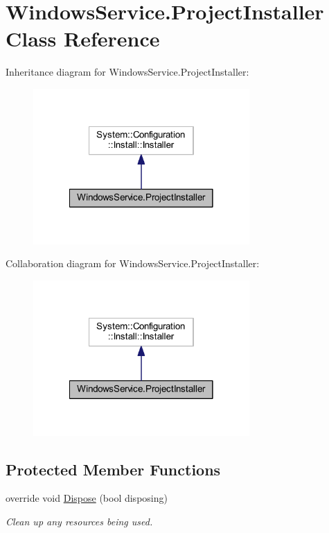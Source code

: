 \hypertarget{class_windows_service_1_1_project_installer}{\section{Windows\-Service.\-Project\-Installer Class Reference}
\label{class_windows_service_1_1_project_installer}
}


Inheritance diagram for Windows\-Service.\-Project\-Installer\-:\nopagebreak
\begin{figure}[H]
\begin{center}
\leavevmode
\includegraphics[width=234pt]{class_windows_service_1_1_project_installer__inherit__graph}
\end{center}
\end{figure}


Collaboration diagram for Windows\-Service.\-Project\-Installer\-:\nopagebreak
\begin{figure}[H]
\begin{center}
\leavevmode
\includegraphics[width=234pt]{class_windows_service_1_1_project_installer__coll__graph}
\end{center}
\end{figure}
\subsection*{Protected Member Functions}
\begin{DoxyCompactItemize}
\item 
override void \hyperlink{class_windows_service_1_1_project_installer_aa57f35eb3d69fcb269363c2bf9445169}{Dispose} (bool disposing)
\begin{DoxyCompactList}\small\item\em Clean up any resources being used. \end{DoxyCompactList}\end{DoxyCompactItemize}



